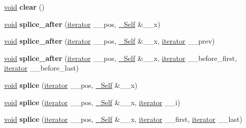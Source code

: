 \begin{DoxyCompactItemize}
\mbox{\label{classslist_a4cab9db69ad3099ef5756eff0df92b6b}} 
\hyperlink{interfacevoid}{void} {\bfseries clear} ()
\item 
\mbox{\label{classslist_ab7aa6a6a336da3138b52e05bc16a1d7e}} 
\hyperlink{interfacevoid}{void} {\bfseries splice\+\_\+after} (\hyperlink{structiterator}{iterator} \+\_\+\+\_\+pos, \hyperlink{classslist}{\+\_\+\+Self} \&\+\_\+\+\_\+x)
\item 
\mbox{\label{classslist_af0e0516c57a7c82210ef9e928e498e95}} 
\hyperlink{interfacevoid}{void} {\bfseries splice\+\_\+after} (\hyperlink{structiterator}{iterator} \+\_\+\+\_\+pos, \hyperlink{classslist}{\+\_\+\+Self} \&\+\_\+\+\_\+x, \hyperlink{structiterator}{iterator} \+\_\+\+\_\+prev)
\item 
\mbox{\label{classslist_a43fff629ab49046d05b0460180c58dd8}} 
\hyperlink{interfacevoid}{void} {\bfseries splice\+\_\+after} (\hyperlink{structiterator}{iterator} \+\_\+\+\_\+pos, \hyperlink{classslist}{\+\_\+\+Self} \&\+\_\+\+\_\+x, \hyperlink{structiterator}{iterator} \+\_\+\+\_\+before\+\_\+first, \hyperlink{structiterator}{iterator} \+\_\+\+\_\+before\+\_\+last)
\item 
\mbox{\label{classslist_accfb0bcfcb3b7d66ac77836627d20227}} 
\hyperlink{interfacevoid}{void} {\bfseries splice} (\hyperlink{structiterator}{iterator} \+\_\+\+\_\+pos, \hyperlink{classslist}{\+\_\+\+Self} \&\+\_\+\+\_\+x)
\item 
\mbox{\label{classslist_af007b198920ec69bcbb505f748b16cda}} 
\hyperlink{interfacevoid}{void} {\bfseries splice} (\hyperlink{structiterator}{iterator} \+\_\+\+\_\+pos, \hyperlink{classslist}{\+\_\+\+Self} \&\+\_\+\+\_\+x, \hyperlink{structiterator}{iterator} \+\_\+\+\_\+i)
\item 
\mbox{\label{classslist_a451ab5963bc85e39ab64defbfaca7a6c}} 
\hyperlink{interfacevoid}{void} {\bfseries splice} (\hyperlink{structiterator}{iterator} \+\_\+\+\_\+pos, \hyperlink{classslist}{\+\_\+\+Self} \&\+\_\+\+\_\+x, \hyperlink{structiterator}{iterator} \+\_\+\+\_\+first, \hyperlink{structiterator}{iterator} \+\_\+\+\_\+last)
\item 
\mbox{\label{classslist_ab02b39bf97f78d7a8d8161af94ac8013}} 

\end{DoxyCompactItemize}
